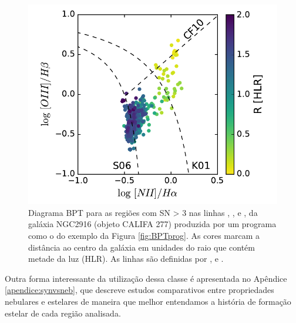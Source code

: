 \begin{figure}
	\centering
	\includegraphics{figuras/K0277-BPT.pdf}
	\caption[Diagrama BPT da galáxia NGC2916]
	{Diagrama BPT para as regiões com SN > 3 nas linhas \Hb, \OIII, \Ha e \NII, da galáxia
NGC2916 (objeto CALIFA 277) produzida por um programa como o do exemplo da Figura \ref{fig:BPTprog}.
As cores marcam a distância ao centro da galáxia em unidades do raio que contém metade da luz (HLR). As
linhas são definidas por \citet[][K01]{Kewley.etal.2001a}, \citet[][S06]{Stasinska.etal.2006a} e
\citet[][CF10]{CidFernandes.etal.2010a}.}
	\label{fig:BPTfig}
\end{figure}

Outra forma interessante da utilização dessa classe é apresentada no Apêndice \ref{apendice:synvsneb}, que descreve estudos comparativos entre propriedades nebulares e estelares de maneira que melhor entendamos a história de formação estelar de cada região analisada.



